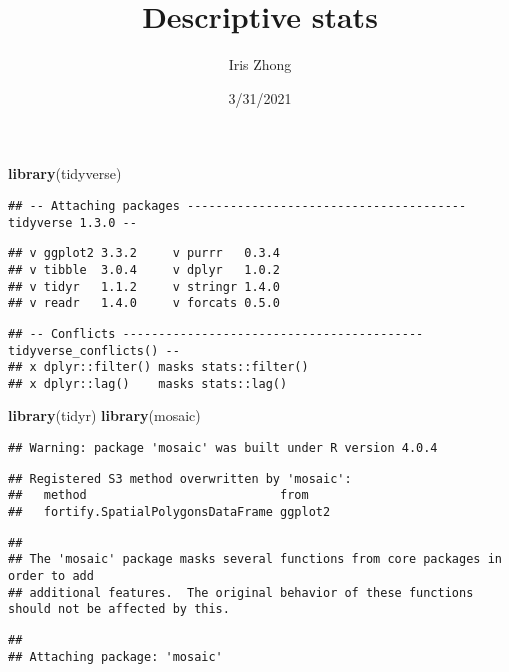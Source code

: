 \documentclass[
]{article}
\title{Descriptive stats}
\author{Iris Zhong}
\date{3/31/2021}
\newenvironment{Shaded}{\begin{snugshade}}{\end{snugshade}}
\newcommand{\KeywordTok}[1]{\textcolor[rgb]{0.13,0.29,0.53}{\textbf{#1}}}
\newcommand{\NormalTok}[1]{#1}
\begin{document}
\maketitle

\begin{Shaded}
\begin{Highlighting}[]
\KeywordTok{library}\NormalTok{(tidyverse)}
\end{Highlighting}
\end{Shaded}

\begin{verbatim}
## -- Attaching packages --------------------------------------- tidyverse 1.3.0 --
\end{verbatim}

\begin{verbatim}
## v ggplot2 3.3.2     v purrr   0.3.4
## v tibble  3.0.4     v dplyr   1.0.2
## v tidyr   1.1.2     v stringr 1.4.0
## v readr   1.4.0     v forcats 0.5.0
\end{verbatim}

\begin{verbatim}
## -- Conflicts ------------------------------------------ tidyverse_conflicts() --
## x dplyr::filter() masks stats::filter()
## x dplyr::lag()    masks stats::lag()
\end{verbatim}

\begin{Shaded}
\begin{Highlighting}[]
\KeywordTok{library}\NormalTok{(tidyr)}
\KeywordTok{library}\NormalTok{(mosaic)}
\end{Highlighting}
\end{Shaded}

\begin{verbatim}
## Warning: package 'mosaic' was built under R version 4.0.4
\end{verbatim}

\begin{verbatim}
## Registered S3 method overwritten by 'mosaic':
##   method                           from   
##   fortify.SpatialPolygonsDataFrame ggplot2
\end{verbatim}

\begin{verbatim}
## 
## The 'mosaic' package masks several functions from core packages in order to add 
## additional features.  The original behavior of these functions should not be affected by this.
\end{verbatim}

\begin{verbatim}
## 
## Attaching package: 'mosaic'
\end{verbatim}
\end{document}
